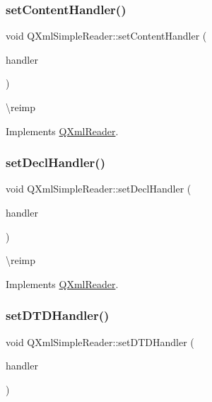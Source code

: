 \subsubsection{\texorpdfstring{setContentHandler()}{setContentHandler()}}
{\footnotesize\ttfamily void Q\+Xml\+Simple\+Reader\+::set\+Content\+Handler (\begin{DoxyParamCaption}\item[{\mbox{\hyperlink{class_q_xml_content_handler}{Q\+Xml\+Content\+Handler}} $\ast$}]{handler }\end{DoxyParamCaption})\hspace{0.3cm}{\ttfamily [virtual]}}

\textbackslash{}reimp 

Implements \mbox{\hyperlink{class_q_xml_reader_a767bc5a20ea120ffc2d60f5c42fb28cd}{Q\+Xml\+Reader}}.

\mbox{\label{class_q_xml_simple_reader_ace5ca778d4b51af1883a8d72a99fb436}} 
\subsubsection{\texorpdfstring{setDeclHandler()}{setDeclHandler()}}
{\footnotesize\ttfamily void Q\+Xml\+Simple\+Reader\+::set\+Decl\+Handler (\begin{DoxyParamCaption}\item[{\mbox{\hyperlink{class_q_xml_decl_handler}{Q\+Xml\+Decl\+Handler}} $\ast$}]{handler }\end{DoxyParamCaption})\hspace{0.3cm}{\ttfamily [virtual]}}

\textbackslash{}reimp 

Implements \mbox{\hyperlink{class_q_xml_reader_a6d16a9420620f829cacb2cdb256d80a7}{Q\+Xml\+Reader}}.

\mbox{\label{class_q_xml_simple_reader_a48b3b2f31a8e0436049fa13072b3bec7}} 
\subsubsection{\texorpdfstring{setDTDHandler()}{setDTDHandler()}}
{\footnotesize\ttfamily void Q\+Xml\+Simple\+Reader\+::set\+D\+T\+D\+Handler (\begin{DoxyParamCaption}\item[{\mbox{\hyperlink{class_q_xml_d_t_d_handler}{Q\+Xml\+D\+T\+D\+Handler}} $\ast$}]{handler }\end{DoxyParamCaption})\hspace{0.3cm}{\ttfamily [virtual]}}


